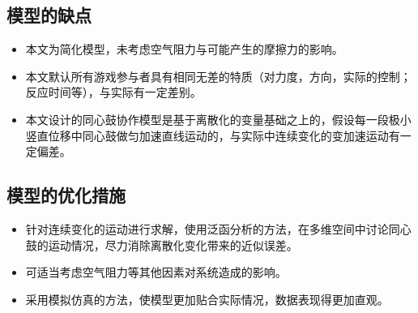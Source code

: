 \documentclass[withoutpreface,bwprint]{cumcmthesis}
\begin{document}
\subsection{模型的缺点}
\begin{itemize}
	\item 本文为简化模型，未考虑空气阻力与可能产生的摩擦力的影响。
	\item 本文默认所有游戏参与者具有相同无差的特质（对力度，方向，实际的控制；反应时间等），与实际有一定差别。
	\item 本文设计的同心鼓协作模型是基于离散化的变量基础之上的，假设每一段极小竖直位移中同心鼓做匀加速直线运动的，与实际中连续变化的变加速运动有一定偏差。
\end{itemize}

\subsection{模型的优化措施}
\begin{itemize}
	\item 针对连续变化的运动进行求解，使用泛函分析的方法，在多维空间中讨论同心鼓的运动情况，尽力消除离散化变化带来的近似误差。
	\item 可适当考虑空气阻力等其他因素对系统造成的影响。
	\item 采用模拟仿真的方法，使模型更加贴合实际情况，数据表现得更加直观。
\end{itemize}

\newpage
\end{document}
